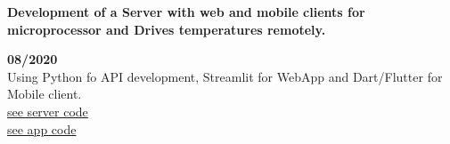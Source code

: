 \begin{minipage}{0.8\textwidth}
    \parbox{0.8\linewidth}{\textbf{Development of a Server with web and mobile clients for microprocessor and Drives temperatures remotely.}} \hfill \textbf{08/2020}\\
    Using Python fo API development, Streamlit for WebApp and Dart/Flutter for Mobile client.\\
    \href{https://github.com/JavierOramas/temperatureMonitor}{see server code}\\
    \href{https://github.com/JavierOramas/temperatureMonitor-app}{see app code}\\
    \end{minipage} \hfill {}\\\\
    